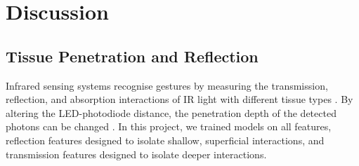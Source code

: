 \documentclass[ oneside,%
                    author={Jack Jarvis},
                    degree={BSc},
                     title={FlexIR: Flexible PCB Wristbands for Infrared Based Gesture Recognition},
                    unit={COMS30045},
                    subtitle={Investigating the Effect of LED Viewing Angle on Gesture Classification in Infrared Sensing Systems}]{dissertation}
\begin{document}
\chapter{Discussion}
\label{chap:discussion}




\section{Tissue Penetration and Reflection}

Infrared sensing systems recognise gestures by measuring the transmission, reflection, and absorption interactions of IR light with different tissue types \cite{diamand2025}. By altering the LED-photodiode distance, the penetration depth of the detected photons can be changed \cite{Yang2007QuantitativeSpectroscopy}. In this project, we trained models on all features, reflection features designed to isolate shallow, superficial interactions, and transmission features designed to isolate deeper interactions. 

\end{document}
